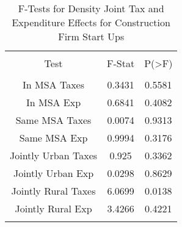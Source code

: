 
\begin{table}[!htbp] \centering 
  \caption{F-Tests for Density Joint Tax and Expenditure Effects for Construction Firm Start Ups} 
  \label{23Ftests} 
\begin{tabular}{@{\extracolsep{5pt}} ccc} 
\\[-1.8ex]\hline 
\hline \\[-1.8ex] 
Test & F-Stat & P(\textgreater F) \\ 
\hline \\[-1.8ex] 
In MSA Taxes & 0.3431 & 0.5581 \\ 
In MSA Exp & 0.6841 & 0.4082 \\ 
Same MSA Taxes & 0.0074 & 0.9313 \\ 
Same MSA Exp & 0.9994 & 0.3176 \\ 
Jointly Urban Taxes & 0.925 & 0.3362 \\ 
Jointly Urban Exp & 0.0298 & 0.8629 \\ 
Jointly Rural Taxes & 6.0699 & 0.0138 \\ 
Jointly Rural Exp & 3.4266 & 0.4221 \\ 
\hline \\[-1.8ex] 
\end{tabular} 
\end{table} 
